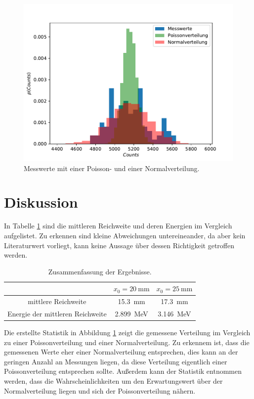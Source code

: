 \begin{figure}
  \centering
  \includegraphics[scale=0.8]{Statistik.pdf}
  \caption{Messwerte mit einer Poisson- und einer Normalverteilung.}
  \label{abb:4}
\end{figure}

\section{Diskussion}
In Tabelle \ref{tab:4} sind die mittleren Reichweite und deren Energien im Vergleich aufgelistet. Zu erkennen sind kleine Abweichungen untereineander,
da aber kein Literaturwert vorliegt, kann keine Aussage über dessen Richtigkeit getroffen werden.
\begin{table}
  \centering
  \caption{Zusammenfassung der Ergebnisse.}
  \label{tab:4}
  \begin{tabular}{c c c}
    \toprule
    & $x_0=\SI{20}{\milli\meter}$ &  $x_0=\SI{25}{\milli\meter}$ \\
    \midrule
    mittlere Reichweite & \SI{15,3}{\milli\meter} & \SI{17,3}{\milli\meter} \\
    Energie der mittleren Reichweite & \SI{2,899}{\mega\eV} & \SI{3,146}{\mega\eV} \\
    \bottomrule
  \end{tabular}
\end{table}

Die erstellte Statistik in Abbildung \ref{abb:4} zeigt die gemessene Verteilung im Vergleich zu einer Poissonverteilung und einer Normalverteilung.
Zu erkennem ist, dass die gemessenen Werte eher einer Normalverteilung entsprechen, dies kann an der geringen Anzahl an Messungen liegen, da diese
Verteilung eigentlich einer Poissonverteilung entsprechen sollte. Außerdem kann der Statistik entnommen werden, dass die Wahrscheinlichkeiten um
den Erwartungswert über der Normalverteilung liegen und sich der Poissonverteilung nähern.
